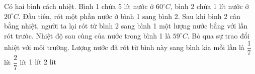 \begin{vidu}
	Có hai bình cách nhiệt. Bình 1 chứa 5 lít nước ở $60^\circ C$, bình 2 chứa 1 lít nước ở $20^\circ C$. Đầu tiên, rót một phần nước ở bình 1 sang bình 2. Sau khi bình 2 cân bằng nhiệt, người ta lại rót từ bình 2 sang bình 1 một lượng nước bằng với lần rót trước. Nhiệt độ sau cùng của nước trong bình 1 là $59^\circ C$. Bỏ qua sự trao đổi nhiệt với môi trường. Lượng nước đã rót từ bình này sang bình kia mỗi lần là
	\choice
	{\True $\dfrac{1}{7}$ lít}
	{$\dfrac{2}{7}$ lít}
	{1 lít}
	{2 lít}
	\end{vidu}
